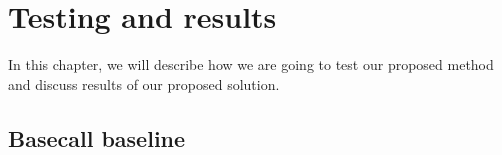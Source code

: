 \chapter{Testing and results}

\label{kap:testRes} %


In this chapter, we will describe how we are going to test our proposed method
and discuss results of our proposed solution.

\section{Basecall baseline}

